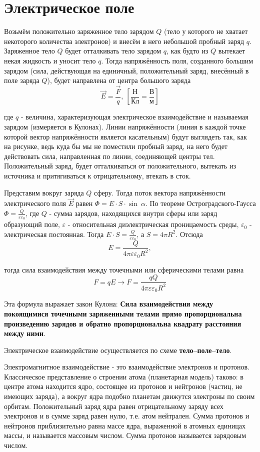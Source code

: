 \documentclass[a6paper, 11pt]{diss_4}
\renewcommand{\'}{\,'}
\begin{document}
\section{Электрическое поле}

 Возьмём положительно заряженное тело зарядом $Q$ (тело у которого не хватает
некоторого количества электронов) и внесём в него небольшой пробный заряд $q$.
Заряженное тело $Q$ будет отталкивать тело зарядом $q$, как будто из $Q$
вытекает некая жидкость и уносит тело $q$. Тогда напряжённость поля, созданного
большим зарядом (сила, действующая на единичный, положительный заряд, внесённый
в поле заряда $Q$), будет направлена от центра большого заряда
\[
\vec{E}=\frac{\vec{F}}{q},\ \left[\frac{Н}{Кл}=\frac{В}{м}\right]
\]

 где $q$ - величина, характеризующая электрическое взаимодействие и называемая
зарядом (измеряется в Кулонах). Линии напряжённости (линия в каждой точке
которой вектор напряжённости является касательным) будут выглядеть так, как на
рисунке, ведь куда бы мы не поместили пробный заряд, на него будет действовать
сила, направленная по линии, соединяющей центры тел. Положительный заряд, будет
отталкиваться от положительного, вытекать из источника и притягиваться к
отрицательному, втекать в сток.

  Представим вокруг заряда $Q$ сферу. Тогда поток вектора напряжённости
электрического поля $\vec{E}$ равен $\Phi=E\cdot S\cdot\sin\ \alpha$. По
теореме Остроградского-Гаусса $\Phi=\frac{Q}{\varepsilon\varepsilon_0}$, где
$Q$ - сумма зарядов, находящихся внутри сферы или заряд образующий поле,
$\varepsilon$ - относительная диэлектрическая проницаемость среды,
$\varepsilon_0$ - электрическая постоянная. Тогда $E\cdot
S=\frac{Q}{\varepsilon\varepsilon_0}$, а $S=4\pi R^2$. Отсюда
\[
E=\frac{Q}{4\pi\varepsilon\varepsilon_0R^2},
\]

тогда сила взаимодействия между точечными или сферическими телами равна
\[
F=qE\to
F=\frac{qQ}{4\pi\varepsilon\varepsilon_0R^2}
\]

  Эта формула выражает закон Кулона: \textbf{Сила взаимодействия между
покоящимися точечными заряженными телами прямо пропорциональна произведению
зарядов и обратно пропорциональна квадрату расстояния между ними}.

Электрическое взаимодействие осуществляется по схеме \textbf{тело--поле--тело}.

  Электромагнитное взаимодействие - это взаимодействие электронов и
протонов. Классическое представление о строении атома (планетарная модель)
таково: в центре атома находится ядро, состоящее из протонов и нейтронов
(частиц, не имеющих заряда), а вокруг ядра подобно планетам движутся электроны
по своим орбитам. Положительный заряд ядра равен отрицательному заряду всех
электронов и в сумме заряд равен нулю, т.е. атом нейтрален. Сумма протонов и
нейтронов приблизительно равна массе ядра, выраженной в атомных единицах массы,
и называется массовым числом. Сумма протонов называется зарядовым числом.
\end{document}
